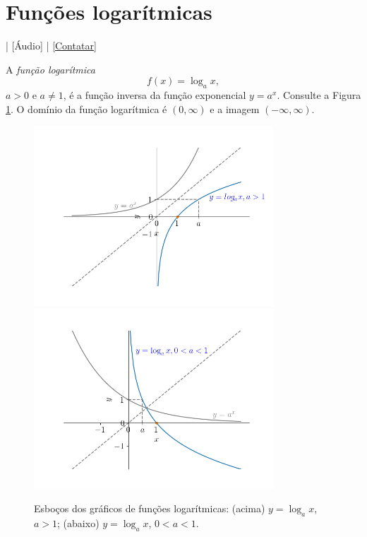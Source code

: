 \section{Funções logarítmicas}\label{cap_funcao_sec_funlog}

\begin{flushright}
  [Vídeo] | [Áudio] | \href{https://phkonzen.github.io/notas/contato.html}{[Contatar]}
\end{flushright}

A \emph{função logarítmica}
\begin{equation}
  f(x) = \log_a x,
\end{equation}
$a>0$ e $a\neq 1$, é a função inversa da função exponencial $y = a^x$. Consulte a Figura \ref{fig:log_graficos}. O domínio da função logarítmica é $(0,\infty)$ e a imagem $(-\infty, \infty)$.

\begin{figure}[H]
  \centering
  \includegraphics[width=0.8\textwidth]{./cap_funcao/dados/fig_log_graficos/fig1}\\
  \includegraphics[width=0.8\textwidth]{./cap_funcao/dados/fig_log_graficos/fig2}
  \caption{Esboços dos gráficos de funções logarítmicas: (acima) $y = \log_a x$, $a>1$; (abaixo) $y = \log_a x$, $0<a<1$.}
  \label{fig:log_graficos}
\end{figure}

